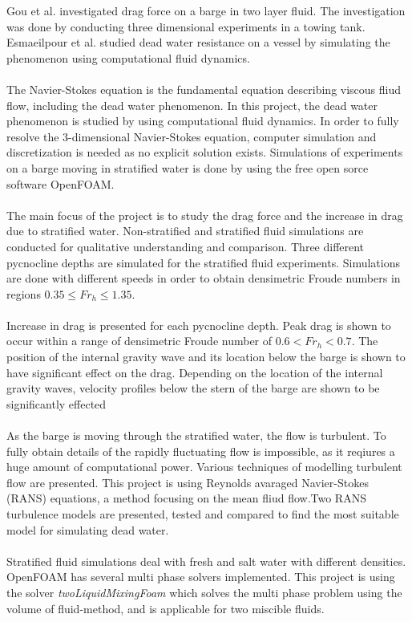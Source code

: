 \documentclass[a4paper, 12pt]{report}
\begin{document}
Gou et al. investigated drag force on a barge in two layer fluid. The investigation was done by conducting three dimensional experiments in a towing tank. \\
Esmaeilpour et al. studied dead water resistance on a vessel by simulating the phenomenon using computational fluid dynamics.\\
\\
The Navier-Stokes equation is the fundamental equation describing viscous fliud flow, including the dead water phenomenon. In this project, the dead water phenomenon is studied by using computational fluid dynamics. In order to fully resolve the 3-dimensional Navier-Stokes equation, computer simulation and discretization is needed as no explicit solution exists. Simulations of experiments on a barge moving in stratified water is done by using the free open sorce software OpenFOAM.\\
\\
The main focus of the project is to study the drag force and the increase in drag due to stratified water. Non-stratified and stratified fluid simulations are conducted for qualitative understanding and comparison. Three different pycnocline depths are simulated for the stratified fluid experiments. Simulations are done with different speeds in order to obtain densimetric Froude numbers in regions $0.35 \leq Fr_h \leq 1.35$.\\
\\
Increase in drag is presented for each pycnocline depth. Peak drag is shown to occur within a range of densimetric Froude number of $0.6 < Fr_h < 0.7$. The position of the internal gravity wave and its location below the barge is shown to have significant effect on the drag. Depending on the location of the internal gravity waves, velocity profiles below the stern of the barge are shown to be significantly effected \\
\\
As the barge is moving through the stratified water, the flow is turbulent. To fully obtain details of the rapidly fluctuating flow is impossible, as it reqiures a huge amount of computational power. Various techniques of modelling turbulent flow are presented. This project is using Reynolds avaraged Navier-Stokes (RANS) equations, a method focusing on the mean fliud flow.Two RANS turbulence models are presented, tested and compared to find the most suitable model for simulating dead water.\\
\\
Stratified fluid simulations deal with fresh and salt water with different densities. OpenFOAM has several multi phase solvers implemented. This project is using the solver \textit{twoLiquidMixingFoam} which solves the multi phase problem using the volume of fluid-method, and is applicable for two miscible fluids.\\
\end{document}
